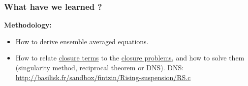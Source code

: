 \documentclass{sintefbeamer}
\begin{document}
\begin{frame}
  \frametitle{What have we learned ? }

\textbf{Methodology: }
  \begin{itemize}
    \item How to derive ensemble averaged equations. 
    \item How to relate \underline{closure terms} to the \underline{closure problems}, and how to solve them (singularity method, reciprocal theorem or DNS).
    DNS: \url{http://basilisk.fr/sandbox/fintzin/Rising-suspension/RS.c}
  \end{itemize}



\end{frame}
\end{document}
